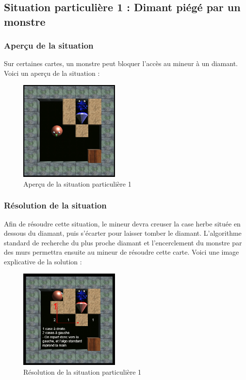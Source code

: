 \documentclass[a4paper,11pt]{article}
\begin{document}
	\newpage
	\subsection{Situation particuli\`ere 1 : Dimant pi\'eg\'e par un monstre}
	
		\subsubsection{Aper\c cu de la situation}
		
		Sur certaines cartes, un monstre peut bloquer l'acc\`es au mineur \`a un diamant. Voici un aper\c cu de la situation :
		
		\begin{figure}[h]
			\center
			\includegraphics[width=5cm]{situation12}
			\caption{\label{situation1} Aper\c cu de la situation particuli\`ere 1 }
		\end{figure}
			
		\subsubsection{R\'esolution de la situation}
		
Afin de r\'esoudre cette situation, le mineur devra creuser la case herbe situ\'ee en dessous du diamant, puis s'\'ecarter pour laisser tomber le diamant. L'algorithme standard de recherche du plus proche diamant et l'encerclement du monstre par des murs permettra ensuite au mineur de r\'esoudre cette carte. Voici une image explicative de la solution :

		\begin{figure}[h]
			\center
			\includegraphics[width=5cm]{situation111}
			\caption{\label{situation1reso} R\'esolution de la situation particuli\`ere 1 }
		\end{figure}
	
\end{document}
